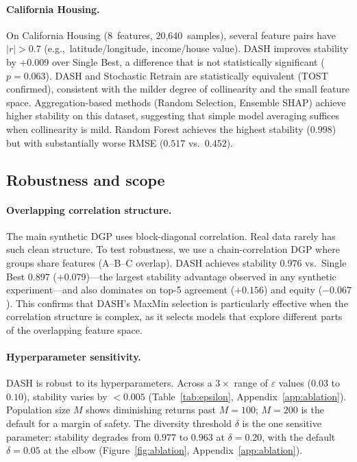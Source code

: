 \documentclass[10pt]{article}
\newcommand{\dash}{\textsc{DASH}}
\newcommand{\eg}{e.g.,\ }
\begin{document}
\paragraph{California Housing.}
On California Housing (8~features, 20,640~samples), several feature
pairs have $|r| > 0.7$ (\eg latitude/longitude, income/house value).
\dash{} improves stability by $+0.009$ over Single Best, a difference
that is not statistically significant ($p = 0.063$). \dash{} and
Stochastic Retrain are statistically equivalent (TOST confirmed),
consistent with the milder degree of collinearity and the small feature
space. Aggregation-based methods (Random Selection, Ensemble SHAP)
achieve higher stability on this dataset, suggesting that simple model
averaging suffices when collinearity is mild. Random Forest achieves
the highest stability ($0.998$) but with substantially worse RMSE
($0.517$ vs.\ $0.452$).

\subsection{Robustness and scope}
\label{sec:robustness}

\paragraph{Overlapping correlation structure.}
The main synthetic DGP uses block-diagonal correlation. Real data rarely
has such clean structure. To test robustness, we use a chain-correlation
DGP where groups share features (A--B--C overlap). \dash{} achieves
stability $0.976$ vs.\ Single Best $0.897$ ($+0.079$)---the largest
stability advantage observed in any synthetic experiment---and also
dominates on top-5 agreement ($+0.156$) and equity ($-0.067$). This
confirms that \dash{}'s MaxMin selection is particularly effective when
the correlation structure is complex, as it selects models that explore
different parts of the overlapping feature space.

\paragraph{Hyperparameter sensitivity.}
\dash{} is robust to its hyperparameters. Across a $3\times$ range of
$\varepsilon$ values ($0.03$ to $0.10$), stability varies by $< 0.005$
(Table~\ref{tab:epsilon}, Appendix~\ref{app:ablation}).
Population size $M$ shows diminishing returns past $M = 100$;
$M = 200$ is the default for a margin of safety.
The diversity threshold $\delta$ is the one sensitive parameter:
stability degrades from $0.977$ to $0.963$ at $\delta = 0.20$, with
the default $\delta = 0.05$ at the elbow
(Figure~\ref{fig:ablation}, Appendix~\ref{app:ablation}).
\end{document}
